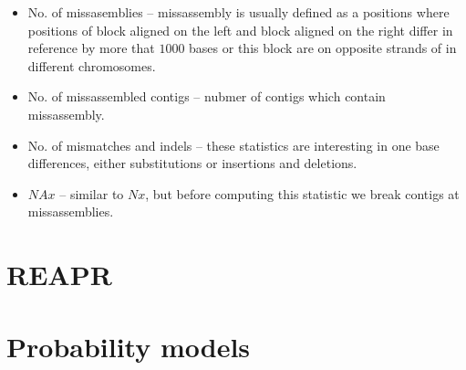 \begin{itemize}
\item No. of missasemblies -- missassembly is usually defined as a positions where
positions of block aligned on the left and block aligned on the right differ in reference
by more that $1000$ bases or this block are on opposite strands of in different chromosomes.
\item No. of missassembled contigs -- nubmer of contigs which contain missassembly.
\item No. of mismatches and indels -- these statistics are interesting in one base differences,
either substitutions or insertions and deletions.
\item $NAx$ -- similar to $Nx$, but before computing this statistic we break
contigs at missassemblies.
\end{itemize}

\section{REAPR}

\section{Probability models}

